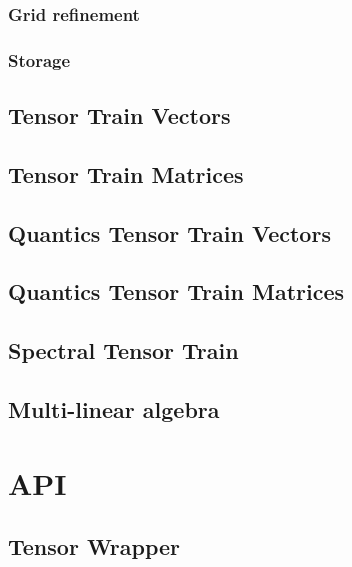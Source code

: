 \documentclass[a4paper,10pt,english]{sphinxmanual}
\begin{document}
\subsection{Grid refinement}
\label{tw:grid-refinement}

\subsection{Storage}
\label{tw:storage}

\section{Tensor Train Vectors}
\label{ttvec:tensor-train-vectors}\label{ttvec::doc}

\section{Tensor Train Matrices}
\label{ttmat:tensor-train-matrices}\label{ttmat::doc}

\section{Quantics Tensor Train Vectors}
\label{qttvec::doc}\label{qttvec:quantics-tensor-train-vectors}

\section{Quantics Tensor Train Matrices}
\label{qttmat::doc}\label{qttmat:quantics-tensor-train-matrices}

\section{Spectral Tensor Train}
\label{stt:spectral-tensor-train}\label{stt::doc}

\section{Multi-linear algebra}
\label{multilinalg:multi-linear-algebra}\label{multilinalg::doc}

\chapter{API}
\label{api:api}\label{api::doc}

\section{Tensor Wrapper}
\label{api-tw:tensor-wrapper}\label{api-tw::doc}\label{api-tw:module-TensorToolbox}
\end{document}

